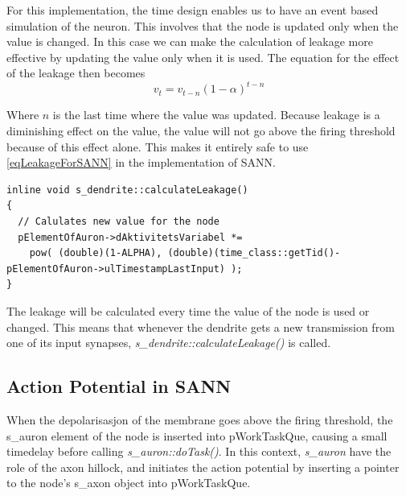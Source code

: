 	For this implementation, the time design enables us to have an event based simulation of the neuron.
	This involves that the node is updated only when the value is changed.
	In this case we can make the calculation of leakage more effective by updating the value only when it is used.
	The equation for the effect of the leakage then becomes
	\begin{equation}
		v_t = v_{t-n} (1-\alpha)^{t-n}
		\label{eqLeakageForSANN}
	\end{equation}
	
	Where $n$ is the last time where the value was updated. 
	Because leakage is a diminishing effect on the value, the value will not go above the firing threshold because of this effect alone.
	This makes it entirely safe to use \eqref{eqLeakageForSANN} in the implementation of SANN.


\begin{lstlisting}
inline void s_dendrite::calculateLeakage()
{ 
  // Calulates new value for the node
  pElementOfAuron->dAktivitetsVariabel *= 
    pow( (double)(1-ALPHA), (double)(time_class::getTid()-pElementOfAuron->ulTimestampLastInput) );
}
\end{lstlisting}

	The leakage will be calculated every time the value of the node is used or changed.
	This means that whenever the dendrite gets a new transmission from one of its input synapses, \emph{s\_dendrite::calculateLeakage()} is called.

	\subsection{Action Potential in SANN}
	\label{ssecSANNAP}
	When the depolarisasjon of the membrane goes above the firing threshold, the s\_auron element of the node is inserted into pWorkTaskQue, causing a small timedelay before calling \emph{s\_auron::doTask()}.
	In this context, \emph{s\_auron} have the role of the axon hillock, and initiates the action potential by inserting a pointer to the node's s\_axon object into pWorkTaskQue.

